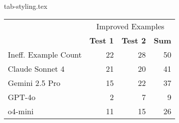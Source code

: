 {tab-styling.tex}

\begin{tabular}{l|rr|r}
  \multicolumn{1}{c}{} & \multicolumn{3}{c}{Improved Examples}            \\
                       & \textbf{Test 1} & \textbf{Test 2} & \textbf{Sum} \\\hline
  Ineff. Example Count & 22              & 28              & 50           \\\hline\hline
  Claude Sonnet 4      & 21              & 20              & 41           \\\hline
  Gemini 2.5 Pro       & 15              & 22              & 37           \\\hline
  GPT-4o               & 2               & 7               & 9            \\\hline
  o4-mini              & 11              & 15              & 26           \\
\end{tabular}
